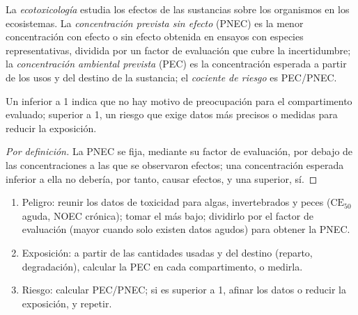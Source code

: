 \begin{definition}[Ecotoxicología]\label{def:b3:environmental-toxicology:ecotoxicology}
La \emph{ecotoxicología} estudia los efectos de las sustancias sobre
los organismos en los ecosistemas. La \emph{concentración prevista sin
efecto} (PNEC) es la menor concentración
con efecto o sin efecto obtenida en ensayos con especies representativas,
dividida por un factor de evaluación que cubre la incertidumbre; la
\emph{concentración ambiental prevista}
(PEC) es la concentración esperada a partir de los usos y del destino de la
sustancia; el \emph{cociente de riesgo} es PEC/PNEC.
\end{definition}

\begin{proposition}\label{prop:b3:environmental-toxicology:risk-quotient}
Un  inferior a 1 indica que no hay motivo de preocupación para el compartimento evaluado; superior a
1, un riesgo que exige datos más precisos o medidas para reducir la exposición.
\end{proposition}

\begin{proof}[Por definición]
La PNEC se fija, mediante su factor de evaluación, por debajo de las concentraciones a las que
se observaron efectos; una concentración esperada inferior a ella no debería, por tanto,
causar efectos, y una superior, sí.
\end{proof}

\begin{method}\label{met:b3:environmental-toxicology:risk}
\begin{enumerate}
  \item Peligro: reunir los datos de toxicidad para algas, invertebrados y peces ($\mathrm{CE_{50}}$
        aguda, NOEC crónica); tomar el más bajo; dividirlo por el factor de evaluación (mayor cuando
        solo existen datos agudos) para obtener la PNEC.
  \item Exposición: a partir de las cantidades usadas y del destino (reparto, degradación),
        calcular la PEC en cada compartimento, o medirla.
  \item Riesgo: calcular PEC/PNEC; si es superior a 1, afinar los datos o reducir la
        exposición, y repetir.
\end{enumerate}
\end{method}

